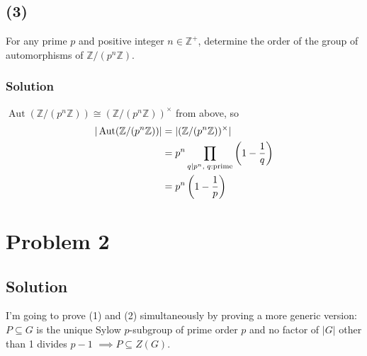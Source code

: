 \documentclass[fleqn]{article}
\DeclareMathOperator{\Aut}{Aut}
\begin{document}
        \subsection{(3)}
        For any prime $p$ and positive integer $n \in \mathbb{Z}^+$, determine the order of the group of automorphisms of $\mathbb{Z}/(p^n\mathbb{Z})$.
            
            \subsubsection{Solution}
            $\Aut(\mathbb{Z}/(p^n\mathbb{Z})) \cong (\mathbb{Z}/(p^n\mathbb{Z}))^\times$ from above, so
            \begin{align}
                |\Aut(\mathbb{Z}/(p^n\mathbb{Z}))| 
                    &= |(\mathbb{Z}/(p^n\mathbb{Z}))^\times| \\
                    &= p^n \prod\limits_{q \mid p^n, \thickspace q: \text{prime}} \left(1 - \frac{1}{q}\right) \\
                    &= p^n \left(1 - \frac{1}{p}\right)
            \end{align}
    
    \section{Problem 2}
        
        \subsection{Solution}
        I'm going to prove (1) and (2) simultaneously by proving a more generic version: $P \subseteq G$ is the unique Sylow $p$-subgroup of prime order $p$ and no factor of $|G|$ other than 1 divides $p - 1$ $\implies P \subseteq Z(G)$.
        
\end{document}
